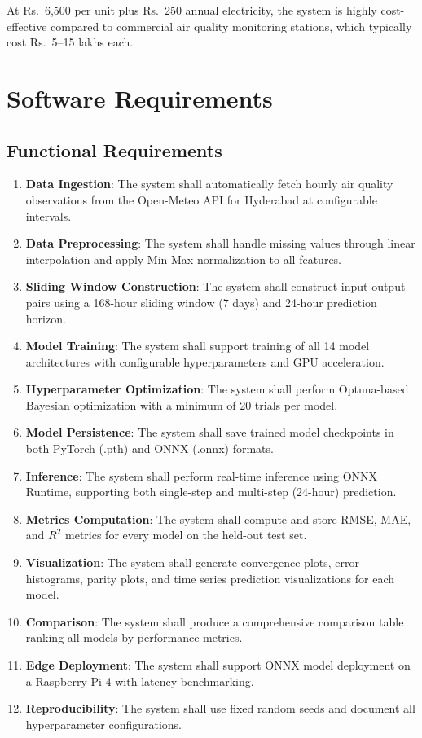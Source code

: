 At Rs.~6,500 per unit plus Rs.~250 annual electricity, the system is highly cost-effective compared to commercial air quality monitoring stations, which typically cost Rs.~5--15 lakhs each.

\section{Software Requirements}

\subsection{Functional Requirements}

\begin{enumerate}[label=FR-\arabic*]
    \item \textbf{Data Ingestion}: The system shall automatically fetch hourly air quality observations from the Open-Meteo API for Hyderabad at configurable intervals.
    \item \textbf{Data Preprocessing}: The system shall handle missing values through linear interpolation and apply Min-Max normalization to all features.
    \item \textbf{Sliding Window Construction}: The system shall construct input-output pairs using a 168-hour sliding window (7 days) and 24-hour prediction horizon.
    \item \textbf{Model Training}: The system shall support training of all 14 model architectures with configurable hyperparameters and GPU acceleration.
    \item \textbf{Hyperparameter Optimization}: The system shall perform Optuna-based Bayesian optimization with a minimum of 20 trials per model.
    \item \textbf{Model Persistence}: The system shall save trained model checkpoints in both PyTorch (.pth) and ONNX (.onnx) formats.
    \item \textbf{Inference}: The system shall perform real-time inference using ONNX Runtime, supporting both single-step and multi-step (24-hour) prediction.
    \item \textbf{Metrics Computation}: The system shall compute and store RMSE, MAE, and $R^2$ metrics for every model on the held-out test set.
    \item \textbf{Visualization}: The system shall generate convergence plots, error histograms, parity plots, and time series prediction visualizations for each model.
    \item \textbf{Comparison}: The system shall produce a comprehensive comparison table ranking all models by performance metrics.
    \item \textbf{Edge Deployment}: The system shall support ONNX model deployment on a Raspberry Pi 4 with latency benchmarking.
    \item \textbf{Reproducibility}: The system shall use fixed random seeds and document all hyperparameter configurations.
\end{enumerate}

